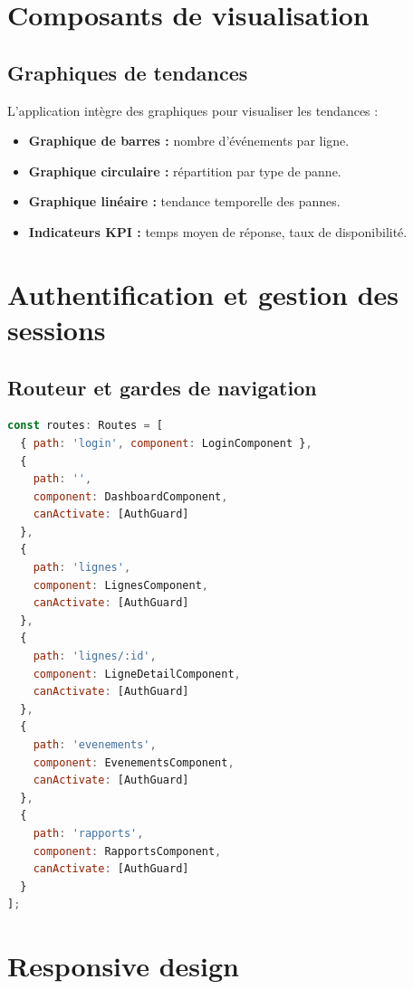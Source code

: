 \section{Composants de visualisation}

\subsection{Graphiques de tendances}

L'application int\`egre des graphiques pour visualiser les tendances :

\begin{itemize}
    \item \textbf{Graphique de barres :} nombre d'\'ev\'enements par ligne.
    \item \textbf{Graphique circulaire :} r\'epartition par type de panne.
    \item \textbf{Graphique lin\'eaire :} tendance temporelle des pannes.
    \item \textbf{Indicateurs KPI :} temps moyen de r\'eponse, taux de disponibilit\'e.
\end{itemize}

\section{Authentification et gestion des sessions}

\subsection{Routeur et gardes de navigation}

\begin{lstlisting}[language=JavaScript,
caption={Configuration du routeur},
label={lst:router_config}]
const routes: Routes = [
  { path: 'login', component: LoginComponent },
  { 
    path: '', 
    component: DashboardComponent,
    canActivate: [AuthGuard]
  },
  { 
    path: 'lignes', 
    component: LignesComponent,
    canActivate: [AuthGuard]
  },
  { 
    path: 'lignes/:id', 
    component: LigneDetailComponent,
    canActivate: [AuthGuard]
  },
  { 
    path: 'evenements', 
    component: EvenementsComponent,
    canActivate: [AuthGuard]
  },
  { 
    path: 'rapports', 
    component: RapportsComponent,
    canActivate: [AuthGuard]
  }
];
\end{lstlisting}

\section{Responsive design}

